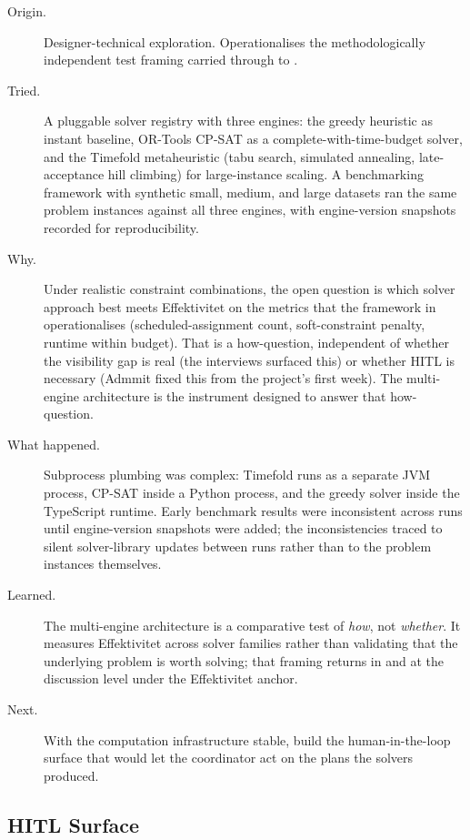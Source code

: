 \begin{description}
  \item[Origin.] Designer-technical exploration. Operationalises the methodologically independent test framing carried through to .
  \item[Tried.] A pluggable solver registry with three engines: the greedy heuristic as instant baseline, OR-Tools CP-SAT as a complete-with-time-budget solver, and the Timefold metaheuristic (tabu search, simulated annealing, late-acceptance hill climbing) for large-instance scaling. A benchmarking framework with synthetic small, medium, and large datasets ran the same problem instances against all three engines, with engine-version snapshots recorded for reproducibility.
  \item[Why.] Under realistic constraint combinations, the open question is which solver approach best meets Effektivitet on the metrics that the framework in  operationalises (scheduled-assignment count, soft-constraint penalty, runtime within budget). That is a how-question, independent of whether the visibility gap is real (the interviews surfaced this) or whether HITL is necessary (Admmit fixed this from the project's first week). The multi-engine architecture is the instrument designed to answer that how-question.
  \item[What happened.] Subprocess plumbing was complex: Timefold runs as a separate JVM process, CP-SAT inside a Python process, and the greedy solver inside the TypeScript runtime. Early benchmark results were inconsistent across runs until engine-version snapshots were added; the inconsistencies traced to silent solver-library updates between runs rather than to the problem instances themselves.
  \item[Learned.] The multi-engine architecture is a comparative test of \emph{how}, not \emph{whether}. It measures Effektivitet across solver families rather than validating that the underlying problem is worth solving; that framing returns in  and at the discussion level under the Effektivitet anchor.
  \item[Next.] With the computation infrastructure stable, build the human-in-the-loop surface that would let the coordinator act on the plans the solvers produced.
\end{description}

\subsection{HITL Surface}
\label{sec:iter-hitl}

